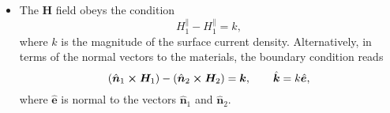 \documentclass[11pt, a4paper]{article}
\renewcommand{\vec}[1]{\bm{#1}} %
\newcommand{\uvec}[1]{\hat{\vec{#1}}} %
\renewcommand{\H}{\vec{H}}  %
\begin{document}
\begin{itemize}
\begin{itemize}
        \item The $ \H $ field obeys the condition
        \begin{equation*}
            H_{1}^{\parallel} - H_{1}^{\parallel} = k,
        \end{equation*}
        where $ k $ is the magnitude of the surface current density. Alternatively, in terms of the normal vectors to the materials, the boundary condition reads
        \begin{equation*}
            (\uvec{n}_{1} \cross \H_{1}) - (\uvec{n}_{2}\cross \H_{2}) = \vec{k}, \qquad \uvec{k} = k \uvec{e},
        \end{equation*}
        where $ \uvec{e} $ is normal to the vectors $ \uvec{n}_{1} $ and $ \uvec{n}_{2} $.
    \end{itemize} 

\end{itemize}
\end{document}

